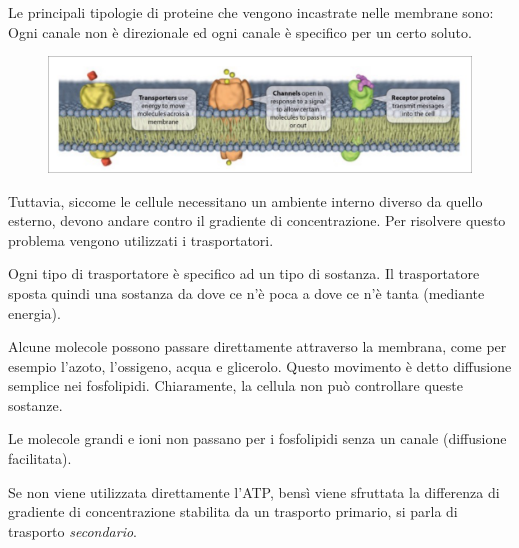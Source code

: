 \documentclass[a4paper]{article}
\begin{document}
Le principali tipologie di proteine che vengono incastrate nelle membrane sono:
Ogni canale non è direzionale ed ogni canale è specifico per un certo soluto.

\begin{figure}[h!]
    \centering
    \includegraphics[width=\textwidth]{./proteine_mem.png}
\end{figure}

Tuttavia, siccome le cellule necessitano un ambiente interno diverso da quello esterno,
devono andare contro il gradiente di concentrazione.
Per risolvere questo problema vengono utilizzati i trasportatori.

Ogni tipo di trasportatore è specifico ad un tipo di sostanza.
Il trasportatore sposta quindi una sostanza da dove ce n'è poca a dove ce n'è tanta (mediante energia).



Alcune molecole possono passare direttamente attraverso la membrana, come per esempio l'azoto, l'ossigeno, acqua e glicerolo.
Questo movimento è detto diffusione semplice nei fosfolipidi. Chiaramente, la cellula non può controllare queste sostanze.

Le molecole grandi e ioni non passano per i fosfolipidi senza un canale (diffusione facilitata).



Se non viene utilizzata direttamente l'ATP,
bensì viene sfruttata la differenza di gradiente di concentrazione stabilita da un trasporto primario,
si parla di trasporto \textit{secondario}.
\end{document}
